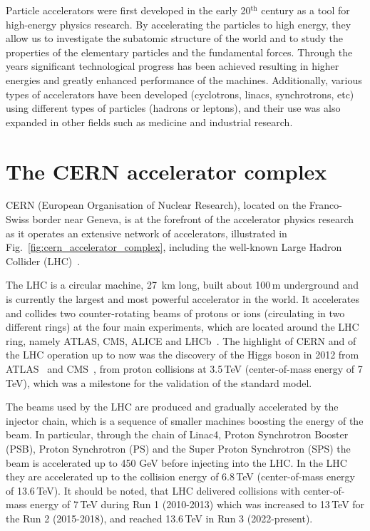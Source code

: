 Particle accelerators were first developed in the early 20$^\mathrm{th}$ century as a tool for high-energy physics research. By accelerating the particles to high energy, they allow us to investigate the subatomic structure of the world and to study the properties of the elementary particles and the fundamental forces. Through the years significant technological progress has been achieved resulting in higher energies and greatly enhanced performance of the machines. Additionally, various types of accelerators have been developed (cyclotrons, linacs, synchrotrons, etc) using different types of particles (hadrons or leptons), and their use was also expanded in other fields such as medicine and industrial research. 

\section{The CERN accelerator complex}

CERN (European Organisation of Nuclear Research), located on the Franco-Swiss border near Geneva, is at the forefront of the accelerator physics research as it operates an extensive network of accelerators, illustrated in Fig.~\ref{fig:cern_accelerator_complex}, including the well-known Large Hadron Collider (LHC)~\cite{Brüning:782076}.

The LHC is a circular machine, 27\, km long, built about 100\,m underground and is currently the largest and most powerful accelerator in the world. It accelerates and collides two counter-rotating beams of protons or ions (circulating in two different rings) at the four main experiments, which are located around the LHC ring, namely ATLAS, CMS, ALICE and LHCb~\cite{ATLAS:2008xda, CMS:2008xjf, ALICE:2008ngc, Alves:1129809}. The highlight of CERN and of the LHC operation up to now was the discovery of the Higgs boson in 2012 from ATLAS~\cite{ATLAS_Higgs} and CMS~\cite{CMS_Higgs}, from proton collisions at 3.5\,TeV (center-of-mass energy of 7\,TeV), which was a milestone for the validation of the standard model. %

The beams used by the LHC are produced and gradually accelerated by the injector chain, which is a sequence of smaller machines boosting the energy of the beam. In particular, through the chain of Linac4, Proton Synchrotron Booster (PSB), Proton Synchrotron (PS) and the Super Proton Synchrotron (SPS) the beam is accelerated up to 450 GeV before injecting into the LHC. In the LHC they are accelerated up to the collision energy of 6.8\,TeV (center-of-mass energy of 13.6\,TeV). It should be noted, that LHC delivered collisions with center-of-mass energy of 7\,TeV during Run 1 (2010-2013) which was increased to 13\,TeV for the Run 2 (2015-2018), and reached 13.6\,TeV in Run 3 (2022-present). 

